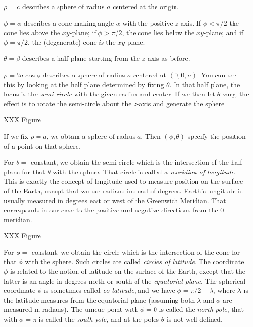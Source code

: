 \begin{example}
$\rho = a$ describes a sphere of radius $a$ centered at the origin.
\end{example}

\begin{example}
$\phi = \alpha$ describes a cone making angle $\alpha$ with the
positive $z$-axis.  If $\phi<\pi/2$ the cone lies above the $xy$-plane;
	if $\phi>\pi/2$, the cone lies below the $xy$-plane; 
	and if $\phi=\pi/2$, the (degenerate) cone \emph{is} the $xy$-plane.
\end{example}

\begin{example}
$\theta = \beta$ describes a half plane starting from the $z$-axis
as before.
\end{example}

\begin{example}
$\rho = 2a\cos\phi$ describes a sphere of radius
$a$ centered at $(0,0,a)$.  You can see this by looking at
the half plane determined by fixing $\theta$.  In that half
plane, the locus is the \emph{semi-circle} with the given
radius and center.  If we then let $\theta$ vary, the effect is
to rotate the semi-circle about the $z$-axis and generate the
sphere

XXX Figure
\end{example}

If we fix $\rho = a$, we obtain a sphere of radius $a$.
Then $(\phi, \theta)$ specify the position of a point on
that sphere.  

For $\theta = $ constant, we obtain the semi-circle
which is the intersection of the half plane for that $\theta$
with the sphere.  That circle is called a {\it meridian of
longitude}.  This is exactly the concept of longitude used to
measure position on the surface of the Earth, except that we
use radians instead of degrees.  Earth's longitude is usually
measured in degrees east or west of the Greenwich Meridian.
That corresponds in our case to the positive and negative
directions from the 0-meridian.  

XXX Figure

For $\phi = $ constant, we obtain the circle which is the
intersection of the cone for that $\phi$ with the sphere.
Such circles are called {\it circles of latitude}.
The coordinate $\phi$ is related to the notion of latitude on the surface
of the Earth, except that the latter is an angle
in degrees north or south of the \emph{equatorial plane}.  The
spherical coordinate $\phi$ is sometimes called \emph{co-latitude},
and we have $\phi = \pi/2 - \lambda$, where $\lambda$ is the latitude
measures from the equatorial plane (assuming both $\lambda$ and $\phi$ are
measured in radians).
The unique point with $\phi = 0$ is called the
\emph{north pole}, that with $\phi = \pi$ is called the
\emph{south pole}, and at the  poles $\theta$ is not well defined.


